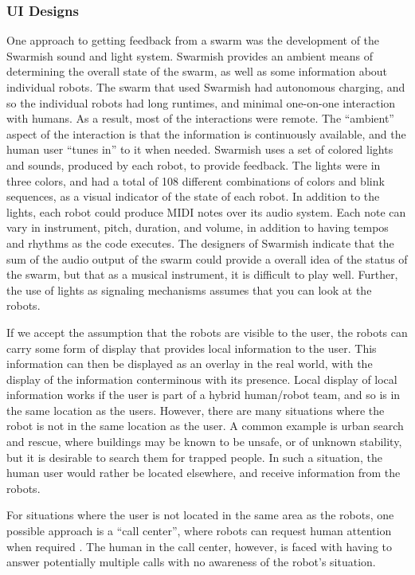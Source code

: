 \documentclass[]{article}
\begin{document}
\subsubsection{UI Designs}

One approach to getting feedback from a swarm was the development of the Swarmish sound and light system\cite{mclurkin2006speaking}. 
Swarmish provides an ambient means of determining the overall state of the swarm, as well as some information about individual robots. 
The swarm that used Swarmish had autonomous charging, and so the individual robots had long runtimes, and minimal one-on-one interaction with humans. 
As a result, most of the interactions were remote.
The ``ambient'' aspect of the interaction is that the information is continuously available, and the human user ``tunes in'' to it when needed. 
Swarmish uses a set of colored lights and sounds, produced by each robot, to provide feedback. 
The lights were in three colors, and had a total of 108 different combinations of colors and blink sequences, as a visual indicator of the state of each robot. 
In addition to the lights, each robot could produce MIDI notes over its audio system. 
Each note can vary in instrument, pitch, duration, and volume, in addition to having tempos and rhythms as the code executes. 
The designers of Swarmish indicate that the sum of the audio output of the swarm could provide a overall idea of the status of the swarm, but that as a musical instrument, it is difficult to play well. 
Further, the use of lights as signaling mechanisms assumes that you can look at the robots. 

If we accept the assumption that the robots are visible to the user, the robots can carry some form of display that provides local information to the user. 
This information can then be displayed as an overlay in the real world, with the display of the information conterminous with its presence\cite{Daily:2003:WEI:820752.821587}. 
Local display of local information works if the user is part of a hybrid human/robot team, and so is in the same location as the users. 
However, there are many situations where the robot is not in the same location as the user. 
A common example is urban search and rescue, where buildings may be known to be unsafe, or of unknown stability, but it is desirable to search them for trapped people. 
In such a situation, the human user would rather be located elsewhere, and receive information from the robots. 

For situations where the user is not located in the same area as the robots, one possible approach is a ``call center'', where robots can request human attention when required \cite{chen2011supervisory}. The human in the call center, however, is faced with having to answer potentially multiple calls with no awareness of the robot's situation. 
\end{document}
